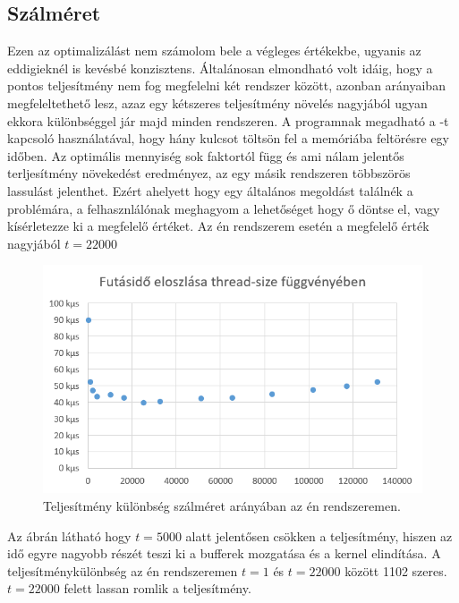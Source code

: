 \subsection{Szálméret}

Ezen az optimalizálást nem számolom bele a végleges értékekbe, ugyanis az eddigieknél is kevésbé konzisztens. Általánosan elmondható volt idáig, hogy a pontos teljesítmény nem fog megfelelni két rendszer között, azonban arányaiban megfeleltethető lesz, azaz egy kétszeres teljesítmény növelés nagyjából ugyan ekkora különbséggel jár majd minden rendszeren.
A programnak megadható a -t kapcsoló használatával, hogy hány kulcsot töltsön fel a memóriába feltörésre egy időben. Az optimális mennyiség sok faktortól függ és ami nálam jelentős terljesítmény növekedést eredményez, az egy másik rendszeren többszörös lassulást jelenthet. Ezért ahelyett hogy egy általános megoldást találnék a problémára, a felhasznlálónak meghagyom a lehetőséget hogy ő döntse el, vagy kísérletezze ki a megfelelő értéket.
Az én rendszerem esetén a megfelelő érték nagyjából $t = \num{22000}$

\begin{figure}[H]
    \centering
    \includegraphics[width=\textwidth]{images/charts/thread-size-performance.png}
    \caption{Teljesítmény különbség szálméret arányában az én rendszeremen.}
\end{figure}

Az ábrán látható hogy $t = \num{5000}$ alatt jelentősen csökken a teljesítmény, hiszen az idő egyre nagyobb részét teszi ki a bufferek mozgatása és a kernel elindítása. A teljesítménykülönbség az én rendszeremen $t = \num{1}$ és $t = \num{22000}$ között 1102 szeres. $t = \num{22000}$ felett lassan romlik a teljesítmény.


